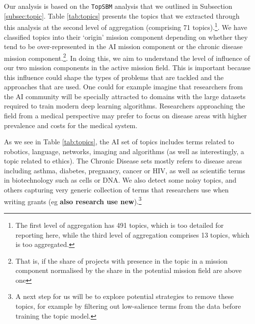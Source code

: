 \documentclass[11pt]{article}
\begin{document}
Our analysis is based on the \texttt{TopSBM} analysis that we outlined in Subsection \ref{subsec:topic}. Table \ref{tab:topics} presents the topics that we extracted through this analysis at the second level of aggregation (comprising 71 topics).\footnote{The first level of aggregation has 491 topics, which is too detailed for reporting here, while the third level of aggregation comprises 13 topics, which is too aggregated.}. We have classified topics into their `origin' mission component depending on whether they tend to be over-represented in the AI mission component or the chronic disease mission component.\footnote{That is, if the share of projects with presence in the topic in a mission component normalised by the share in the potential mission field are above one}. In doing this, we aim to understand the level of influence of our two mission components in the active mission field. This is important because this influence could shape the types of problems that are tackled and the approaches that are used. One could for example imagine that researchers from the AI community will be specially attracted to domains with the large datasets required to train modern deep learning algorithms. Researchers approaching the field from a medical perspective may prefer to focus on disease areas with higher prevalence and costs for the medical system. 

As we see in Table \ref{tab:topics}, the AI set of topics includes terms related to robotics, language, networks, imaging and algorithms (as well as interestingly, a topic related to ethics). The Chronic Disease sets mostly refers to disease areas including asthma, diabetes, pregnancy, cancer or HIV, as well as scientific terms in biotechnology such as cells or DNA. We also detect some noisy topics, and others capturing very generic collection of terms that researchers use when writing grants (eg \textbf{also research use new}).\footnote{A next step for us will be to explore potential strategies to remove these topics, for example by filtering out low-salience terms from the data before training the topic model.}
\end{document}
